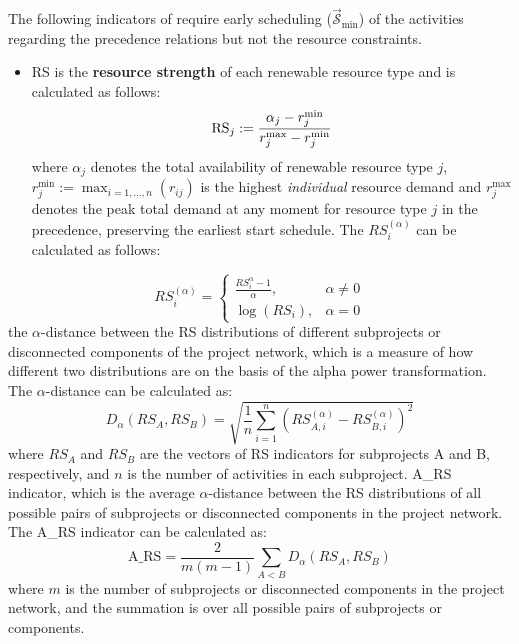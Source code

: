 \documentclass[preprint,
3p]{elsarticle} %
\providecommand{\tightlist}{%
  \setlength{\itemsep}{0pt}\setlength{\parskip}{0pt}}
\begin{document}
\begin{appendices}
The following indicators of \citet{patterson1976project} require early
scheduling (\(\overrightarrow{\mathcal{S}}_{\min}\)) of the activities
regarding the precedence relations but not the resource constraints.

\begin{itemize}
\tightlist
\item
  RS is the \textbf{resource strength} of each renewable resource type
  and is calculated as follows: \begin{equation}
  \label{eq:RS}
    \textnormal{RS}_{j}:=\frac{\alpha_{j}-r_{j}^{\min}}{r_{j}^{\max}-r_{j}^{\min}}
  \end{equation} \noindent  where \(\alpha_{j}\) denotes the total
  availability of renewable resource type \(j\),
  \(r_{j}^{\min}:= \max_{i=1,...,n} (r_{ij})\) is the highest
  \emph{individual} resource demand and \(r_{j}^{\max}\) denotes the
  peak total demand at any moment for resource type \(j\) in the
  precedence, preserving the earliest start schedule. The
  \(RS_i^{(\alpha)}\) can be calculated as follows:
\end{itemize}

\begin{equation}
\label{eq:RS_A}
RS_i^{(\alpha)} = \begin{cases}
\frac{RS_i^\alpha - 1}{\alpha}, & \alpha \neq 0 \\
\log(RS_i), & \alpha = 0
\end{cases}
\end{equation} the \(\alpha\)-distance between the RS distributions of
different subprojects or disconnected components of the project network,
which is a measure of how different two distributions are on the basis
of the alpha power transformation. The \(\alpha\)-distance can be
calculated as: \begin{equation}
\label{eq_D_RS}
D_{\alpha}(RS_A, RS_B) = \sqrt{\frac{1}{n} \sum_{i=1}^n (RS_{A,i}^{(\alpha)} - RS_{B,i}^{(\alpha)})^2}
\end{equation} \noindent where \(RS_A\) and \(RS_B\) are the vectors of
RS indicators for subprojects A and B, respectively, and \(n\) is the
number of activities in each subproject. A\_RS indicator, which is the
average \(\alpha\)-distance between the RS distributions of all possible
pairs of subprojects or disconnected components in the project network.
The A\_RS indicator can be calculated as: \begin{equation}
\text{A\_RS} = \frac{2}{m(m-1)} \sum_{A < B} D_{\alpha}(RS_A, RS_B)
\end{equation} \noindent where \(m\) is the number of subprojects or
disconnected components in the project network, and the summation is
over all possible pairs of subprojects or components.


\end{appendices}
\end{document}
